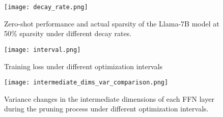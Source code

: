 
\begin{figure}
    \centering
    \texttt{[image: decay\_rate.png]}
    \caption{Zero-shot performance and actual sparsity of the Llama-7B model at 50\% sparsity under different decay rates.}
    \label{fig:Decay Rate}
\end{figure}




\begin{figure}
    \centering
    \texttt{[image: interval.png]}
    \caption{Training loss under different optimization intervals}
    \label{fig:Optimization Intervals Loss}
\end{figure}

\begin{figure}[ht]
    \centering
    \texttt{[image: intermediate\_dims\_var\_comparison.png]}
    \caption{Variance changes in the intermediate dimensions of each FFN layer during the pruning process under different optimization intervals.}
    \label{fig:Optimization Intervals Variance}
\end{figure}

\begin{table*}
  \centering
  \caption{\label{Llama-13B}
    Performance on zero-shot tasks and perplexity on the Wikitext2 dataset for the compressed Llama-13B and Llama-2-13B model.
  }
\end{table*}


